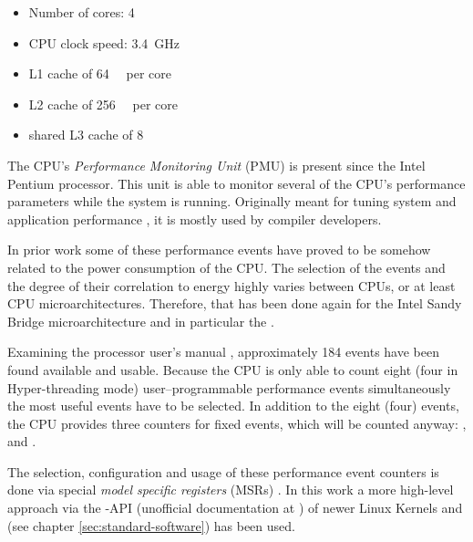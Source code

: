 \begin{itemize}

\item Number of cores: 4

\item CPU clock speed: \SI{3.4}{\giga\hertz}

\item L1 cache of \SI{64}{\kibi\byte} per core\cite{intel2011softdev1}

\item L2 cache of \SI{256}{\kibi\byte} per core\cite{intel2011softdev1}

\item shared L3 cache of \SI{8}{\mebi\byte}\cite{intel2011softdev1}

\end{itemize}


\label{sec:pmu}

The CPU's \emph{Performance Monitoring Unit} (PMU) is present since the
Intel\TReg{} Pentium processor. This unit is able to monitor several of the
CPU's performance parameters while the system is running. Originally meant for
tuning system and application performance \cite{intel2011softdev3b}, it is
mostly used by compiler developers.

In prior work \cite{bellosa2000benefits,snowdon2010operating,
weissel2002process,kellner03tempcontrol,bertran2010decomposable} some of these
performance events have proved to be somehow related to the power consumption of
the CPU. The selection of the events and the degree of their correlation to
energy highly varies between CPUs, or at least CPU microarchitectures.
Therefore, that has been done again for the Intel\TReg{} Sandy Bridge
microarchitecture and in particular the \JWPcpu{}.

Examining the processor user's manual \cite{intel2011events}, approximately 184
events have been found available and usable. Because the CPU is only able to
count eight (four in Hyper-threading \cite{wiki:HT} mode) user--programmable
performance events simultaneously \cite{intel2011softdev1} the most useful
events have to be selected. In addition to the eight (four) events, the CPU
provides three counters for fixed events, which will be counted anyway:
,  and
.

The selection, configuration and usage of these performance event counters is
done via special \emph{model specific registers} (MSRs)
\cite{intel2011softdev3b}. In this work a more high-level approach via the
-API (unofficial documentation at
\cite{weaver2011perfevents}) of newer Linux Kernels and \JWTlibpfm{} (see
chapter \ref{sec:standard-software}) has been used.


